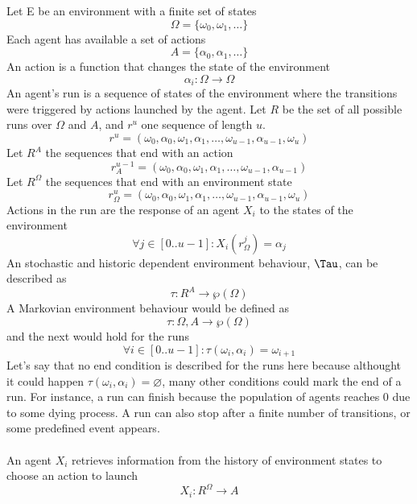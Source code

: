\documentclass{report}
\begin{document}
Let E be an environment with a finite set of states 
\begin{equation}
	\Omega = \{\omega_0,\omega_1,\ldots \}
\end{equation}
Each agent has available a set of actions 
\begin{equation}
	A = \{ \alpha_0, \alpha_1, \ldots \} 
\end{equation}
An action is a function that changes the state of the environment 
\begin{equation}
	\alpha_i : \Omega \longrightarrow \Omega 
\end{equation}
An agent's run is a sequence of states of the environment where the transitions were triggered 
by actions launched by the agent. Let $R$ be the set of all possible runs over $\Omega$ and $A$, and
$r^{u}$ one sequence of length $u$.
\begin{equation}
	r^{u} = ( \omega_0 , \alpha_0 , \omega_1 , \alpha_1 ,\ldots, \omega_{u-1} , \alpha_{u-1} , \omega_u )
\end{equation}
Let $R^{A}$ the sequences that end with an action 
\begin{equation}
	r^{u-1}_{A} = ( \omega_0 , \alpha_0 , \omega_1 , \alpha_1 ,\ldots, \omega_{u-1} , \alpha_{u-1} )
\end{equation}
Let $R^{\Omega}$ the sequences that end with an environment state 
\begin{equation}
	r^{u}_{\Omega} = ( \omega_0 , \alpha_0 , \omega_1 , \alpha_1 ,\ldots, \omega_{u-1} , \alpha_{u-1} , \omega_u )
\end{equation}
Actions in the run are the response of an agent $X_i$ to the states of the environment
\begin{equation}
	\forall j \in [0..u-1] : X_i(r^{j}_{\Omega}) = \alpha_j
\end{equation}
An stochastic and historic dependent environment behaviour, $\Tau$, can be described as
\begin{equation}
	\tau : R^{A} \longrightarrow \wp(\Omega)
\end{equation}
A Markovian environment behaviour would be defined as
\begin{equation}
	\tau : \Omega,A \longrightarrow \wp(\Omega)
\end{equation}
and the next would hold for the runs
\begin{equation} 
	\forall i \in [0..u-1] : \tau(\omega_i, \alpha_i) = \omega_{i+1}
\end{equation}
Let's say that no end condition is described for the runs here because althought it could happen
$\tau(\omega_i, \alpha_i) = \varnothing$, many other conditions could mark the end of a run.
For instance, a run can finish because the population of agents reaches 0 due to some dying process.
A run can also stop after a finite number of transitions, or some predefined event appears.\\
\\
An agent $X_i$ retrieves information from the history of environment states to choose an action to launch
\begin{equation}
	X_i : R^{\Omega} \longrightarrow A 
\end{equation}
\end{document}
